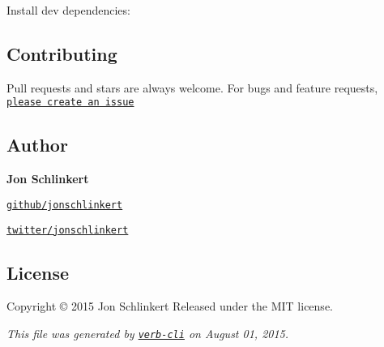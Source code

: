 Install dev dependencies\+:




\subsection*{Contributing}

Pull requests and stars are always welcome. For bugs and feature requests, \href{https://github.com/jonschlinkert/extglob/issues/new}{\tt please create an issue}

\subsection*{Author}

{\bfseries Jon Schlinkert}


\begin{DoxyItemize}
\item \href{https://github.com/jonschlinkert}{\tt github/jonschlinkert}
\item \href{http://twitter.com/jonschlinkert}{\tt twitter/jonschlinkert}
\end{DoxyItemize}

\subsection*{License}

Copyright © 2015 Jon Schlinkert Released under the M\+IT license.





{\itshape This file was generated by \href{https://github.com/assemble/verb-cli}{\tt verb-\/cli} on August 01, 2015.} 